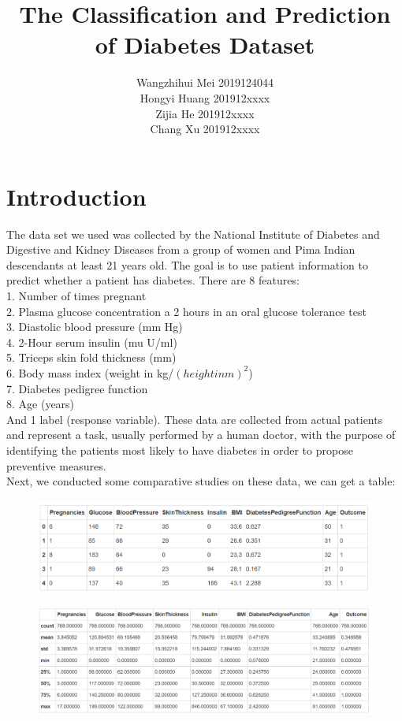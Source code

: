 \documentclass[11pt,en]{elegantpaper}
\title{The Classification and Prediction of Diabetes Dataset}
\author{Wangzhihui Mei 2019124044 \\ Hongyi Huang 201912xxxx \\ Zijia He 201912xxxx \\ Chang Xu 201912xxxx}
\institute{CCNU-UOW JI}
\begin{document}
\maketitle



\section{Introduction}
The data set we used was collected by the 
National Institute of Diabetes and Digestive and Kidney Diseases 
from a group of women and Pima Indian descendants at least 21 years old. The goal is to use patient information to predict whether a patient has diabetes.
There are 8 features:\\
1. Number of times pregnant\\
2. Plasma glucose concentration a 2 hours in an oral glucose tolerance test\\
3. Diastolic blood pressure (mm Hg)\\
4. 2-Hour serum insulin (mu U/ml)\\
5. Triceps skin fold thickness (mm)\\
6. Body mass index (weight in kg/$(height in m)^2$)\\
7. Diabetes pedigree function\\
8. Age (years)\\
And 1 label (response variable). These data are collected from actual patients and represent a task, 
usually performed by a human doctor, with the purpose of identifying the patients most likely to have
diabetes in order to propose preventive measures. \\
Next, we conducted some comparative studies on these data, we can get a table:\\
\begin{figure}[H]
    \centering
    \includegraphics[scale=0.6]{figure/1.PNG}  
\end{figure}

\begin{figure}[H]
    \centering
    \includegraphics[scale=0.6]{figure/2.PNG}  
\end{figure}
\end{document}
